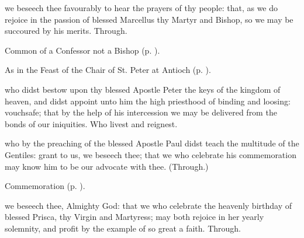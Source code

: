 \memorialCollect
{} we beseech thee favourably to hear the prayers of thy people: that, as we do rejoice in the passion of blessed Marcellus thy Martyr and Bishop, so we may be succoured by his merits. Through.



\begin{rubric}
	Common of a Confessor not a Bishop (p. \pageref{AbbotCollect}).
\end{rubric}


\clearpage
{}

\begin{rubric}
	As in the Feast of the Chair of St. Peter at Antioch (p. \pageref{CathedraAntioch}).
\end{rubric}

{} who didst bestow upon thy blessed Apostle Peter the keys of the kingdom of heaven, and didst appoint unto him the high priesthood of binding and loosing: vouchsafe; that by the help of his intercession we may be delivered from the bonds of our iniquities. Who livest and reignest.

 who by the preaching of the blessed Apostle Paul didst teach the multitude of the Gentiles: grant to us, we beseech thee; that we who celebrate his commemoration may know him to be our advocate with thee. (Through.)

\begin{rubric}
    Commemoration  (p. \pageref{PriscaCollect}).
\end{rubric}




\memorialCollect\label{PriscaCollect}
 we beseech thee, Almighty God: that we who celebrate the heavenly birthday of blessed Prisca, thy Virgin and Martyress; may both rejoice in her yearly solemnity, and profit by the example of so great a faith. Through.


